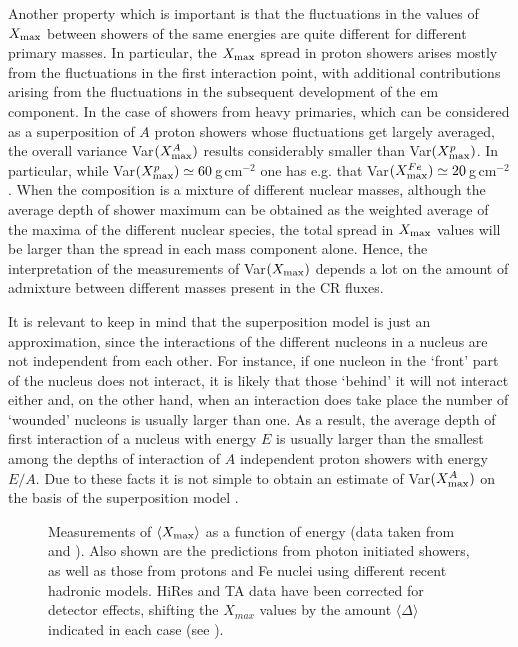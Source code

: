 \documentclass[twoside,12pt]{article}
\begin{document}
Another property which is important is that the fluctuations in the values of $X_{\rm max}$ between showers of the same energies are quite different for different primary masses. In particular, the $X_{\rm max}$ spread in proton showers arises mostly from the fluctuations in the first interaction point, with additional contributions arising from the fluctuations in the subsequent development of the em component. In the case of showers from heavy primaries, which can  be considered as a superposition of $A$ proton showers whose fluctuations get largely averaged,  the overall variance Var$(X^A_{\rm max})$ results considerably smaller than  Var$(X^p_{\rm max})$. In particular, while Var$(X^p_{\rm max})\simeq 60$\,g\,cm$^{-2}$ one has e.g. that Var$(X^{Fe}_{\rm max})\simeq 20$\,g\,cm$^{-2}$. When the composition is a mixture of different nuclear masses,  although the average depth of shower maximum can be obtained as the weighted average of the maxima of the different nuclear species, the total spread in $X_{\rm max}$ values will be larger than the spread in each mass component alone. Hence, the interpretation of the measurements of Var$(X_{\rm max})$ depends a lot on the amount of admixture between different masses present in the CR fluxes. 

It is relevant to keep in mind that the superposition model is just an approximation, since the interactions of the different nucleons in a nucleus are not independent from each other. For instance, if one nucleon in the `front' part of the nucleus does not interact, it is likely that those `behind' it will not interact either and, on the other hand, when an interaction does take place the number of `wounded' nucleons is usually larger than one. As a result, the average depth of first interaction of a nucleus with energy $E$  is usually larger than the smallest among the depths of interaction of $A$ independent proton showers with energy $E/A$. Due to these facts it is not simple to obtain an estimate of Var$(X_{\rm max}^A)$ on the basis of the superposition model \cite{semisup}.


\begin{figure}[tb]
\begin{center}
\begin{minipage}[t]{8 cm}
\centerline{}
\end{minipage}
\caption{Measurements of $\langle X_{\rm max}\rangle$ as a function of energy (data taken from \cite{ka12} and \cite{augerxmax}). Also shown are the predictions from photon initiated showers, as well as those from protons and Fe nuclei using different recent hadronic models. HiRes
and TA data have been corrected for detector effects, shifting the $X_{max}$ values by the amount $\langle \Delta\rangle$ indicated in each case (see \cite{ka12}).
 \label{xmaxvse}}
\end{center}
\end{figure}
\end{document}

